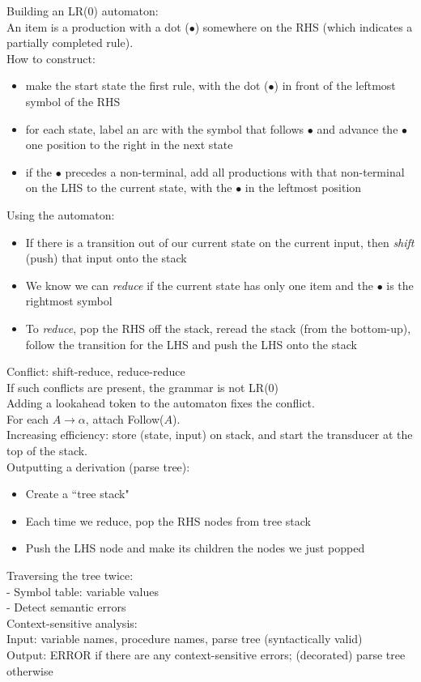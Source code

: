 \documentclass[12pt]{article}
\begin{document}
\noindent
Building an LR(0) automaton:\\
An item is a production with a dot ($\bullet$) somewhere on the RHS (which indicates a partially completed rule).\\
How to construct:
\begin{itemize}
	\renewcommand\labelitemi{--}
	\item make the start state the first rule, with the dot ($\bullet$) in front of the leftmost symbol of the RHS
	\item for each state, label an arc with the symbol that follows $\bullet$ and advance the $\bullet$ one position to the right in the next state
	\item if the $\bullet$ precedes a non-terminal, add all productions with that non-terminal on the LHS to the current state, with the $\bullet$ in the leftmost position
\end{itemize}
Using the automaton:
\begin{itemize}
	\renewcommand\labelitemi{--}
	\item If there is a transition out of our current state on the current input, then \emph{shift} (push) that input onto the stack
	\item We know we can \emph{reduce} if the current state has only one item and the $\bullet$ is the rightmost symbol
	\item To \emph{reduce}, pop the RHS off the stack, reread the stack (from the bottom-up), follow the transition for the LHS and push the LHS onto the stack
\end{itemize}
Conflict: shift-reduce, reduce-reduce\\
If such conflicts are present, the grammar is not LR(0)\\
Adding a lookahead token to the automaton fixes the conflict.\\
For each $A \rightarrow \alpha$, attach Follow($A$).\\
Increasing efficiency: store (state, input) on stack, and start the transducer at the top of the stack.\\

\clearpage
Outputting a derivation (parse tree):
\begin{itemize}
	\renewcommand\labelitemi{--}
	\item Create a ``tree stack"
	\item Each time we reduce, pop the RHS nodes from tree stack
	\item Push the LHS node and make its children the nodes we just popped
\end{itemize}
Traversing the tree twice:\\
- Symbol table: variable values\\
- Detect semantic errors\\
Context-sensitive analysis:\\
Input: variable names, procedure names, parse tree (syntactically valid)\\
Output: ERROR if there are any context-sensitive errors; (decorated) parse tree otherwise
\end{document}
